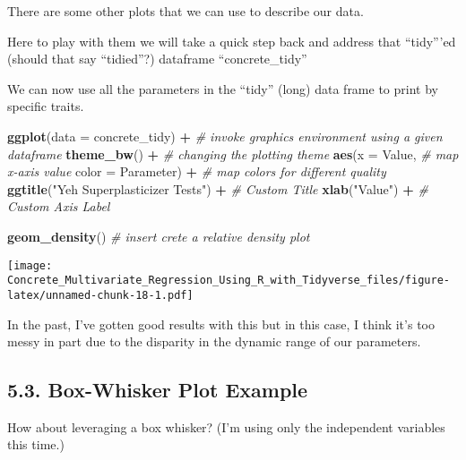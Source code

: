 \documentclass[]{article}
\newenvironment{Shaded}{\begin{snugshade}}{\end{snugshade}}
\newcommand{\CommentTok}[1]{\textcolor[rgb]{0.56,0.35,0.01}{\textit{#1}}}
\newcommand{\DataTypeTok}[1]{\textcolor[rgb]{0.13,0.29,0.53}{#1}}
\newcommand{\KeywordTok}[1]{\textcolor[rgb]{0.13,0.29,0.53}{\textbf{#1}}}
\newcommand{\NormalTok}[1]{#1}
\newcommand{\OperatorTok}[1]{\textcolor[rgb]{0.81,0.36,0.00}{\textbf{#1}}}
\newcommand{\StringTok}[1]{\textcolor[rgb]{0.31,0.60,0.02}{#1}}
\begin{document}
There are some other plots that we can use to describe our data.

Here to play with them we will take a quick step back and address that
``tidy'''ed (should that say ``tidied''?) dataframe ``concrete\_tidy''

We can now use all the parameters in the ``tidy'' (long) data frame to
print by specific traits.

\begin{Shaded}
\begin{Highlighting}[]
\KeywordTok{ggplot}\NormalTok{(}\DataTypeTok{data =}\NormalTok{ concrete_tidy) }\OperatorTok{+}\StringTok{            }\CommentTok{# invoke graphics environment using a given dataframe}
\StringTok{  }
\StringTok{  }\KeywordTok{theme_bw}\NormalTok{() }\OperatorTok{+}\StringTok{                            }\CommentTok{# changing the plotting theme}
\StringTok{  }
\StringTok{  }\KeywordTok{aes}\NormalTok{(}\DataTypeTok{x      =}\NormalTok{ Value,                     }\CommentTok{# map x-axis value}
      \DataTypeTok{color  =}\NormalTok{ Parameter) }\OperatorTok{+}\StringTok{               }\CommentTok{# map colors for different quality}
\StringTok{  }
\StringTok{  }\KeywordTok{ggtitle}\NormalTok{(}\StringTok{"Yeh Superplasticizer Tests"}\NormalTok{) }\OperatorTok{+}\StringTok{ }\CommentTok{# Custom Title}
\StringTok{  }
\StringTok{  }\KeywordTok{xlab}\NormalTok{(}\StringTok{"Value"}\NormalTok{) }\OperatorTok{+}\StringTok{                         }\CommentTok{#  Custom Axis Label}

\StringTok{  }\KeywordTok{geom_density}\NormalTok{()                          }\CommentTok{# insert crete a relative density plot }
\end{Highlighting}
\end{Shaded}

\texttt{[image: Concrete\_Multivariate\_Regression\_Using\_R\_with\_Tidyverse\_files/figure-latex/unnamed-chunk-18-1.pdf]}

In the past, I've gotten good results with this but in this case, I
think it's too messy in part due to the disparity in the dynamic range
of our parameters.

\hypertarget{box-whisker-plot-example}{%
\subsection{5.3. Box-Whisker Plot
Example}\label{box-whisker-plot-example}}

How about leveraging a box whisker? (I'm using only the independent
variables this time.)
\end{document}
